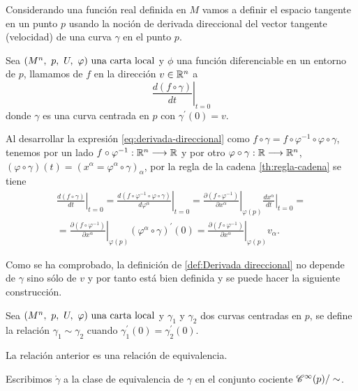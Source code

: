 Considerando una función real definida en $M$ vamos a definir el espacio tangente en un
punto $p$ usando la noción de derivada direccional del vector tangente (velocidad) de una curva
$\gamma$ en el punto $p$.

\begin{definition}
  Sea $(M^n,\ p,\ U,\ \varphi)\textmd{ una carta local}$ y $\phi$ una función diferenciable en un entorno de $p$, llamamos
   de $f$ en la dirección $v\in\mathbb{R}^n$ a
  \begin{equation}
    \label{eq:derivada-direccional}
    \left.\frac{d(f\circ\gamma)}{dt}\right|_{t=0}
  \end{equation}
  donde $\gamma$ es una curva centrada en $p$ con $\gamma^{'}(0)=v$.
\end{definition}

Al desarrollar la expresión \ref{eq:derivada-direccional} como
$f\circ\gamma=f\circ\varphi^{-1}\circ\varphi\circ\gamma$, tenemos por un lado
$f\circ\varphi^{-1}:\mathbb{R}^n\longrightarrow \mathbb{R}$
y por otro
$\varphi\circ\gamma:\mathbb{R}\longrightarrow \mathbb{R}^n$, $(\varphi\circ\gamma)(t)=
(x^\alpha=\varphi^\alpha\circ\gamma)_{\alpha}$,
por la regla de la cadena \ref{th:regla-cadena} se tiene
\begin{multline*}
  \left.\frac{d(f\circ\gamma)}{dt}\right|_{t=0}=
  \left.\frac{d(f\circ\varphi^{-1}\circ\varphi\circ\gamma)}{d\varphi^\alpha}\right|_{t=0}=
  \left.\frac{\partial(f\circ\varphi^{-1})}{\partial x^\alpha}\right|_{\varphi(p)}\left.\frac{d
  x^\alpha  }{dt}\right|_{t=0}=\\
  =\left.\frac{\partial(f\circ\varphi^{-1})}{\partial x^\alpha}\right|_{\varphi(p)}\left.
  (\varphi^\alpha\circ\gamma)^{'}(0)=\left.\frac{\partial(f\circ\varphi^{-1})}{\partial x^\alpha}\right|_{\varphi(p)}\left.
  v_\alpha.
\end{multline*}

Como se ha comprobado, la definición de \ref{def:Derivada direccional} no depende de $\gamma$
sino sólo de $v$ y por tanto está bien definida y se puede hacer la siguiente construcción.

Sea $(M^n,\ p,\ U,\ \varphi)\textmd{ una carta local}$ y $\gamma_1$ y $\gamma_2$ dos curvas centradas en $p$, se define la relación
$\gamma_1\sim\gamma_2$ cuando $\gamma_1^{'}(0)=\gamma_2^{'}(0)$.

\begin{exercise}
  \label{ex:relacion-equivalencia}
  La relación anterior es una relación de equivalencia.
\end{exercise}

Escribimos $\mathring{\gamma}$ a la clase de equivalencia de $\gamma$ en el conjunto cociente
$\mathscr{C}^\infty(p)/\sim$.

